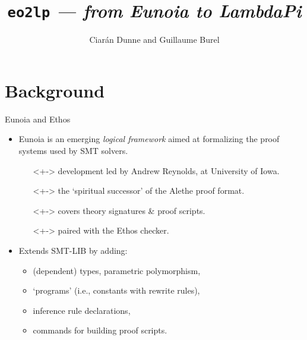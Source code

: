 \documentclass[handout, lualatex, compress, 12pt-------------------------------------------------------------------------------------------------------------]{beamer}
\title{\texttt{eo2lp} \textit{--- from Eunoia to LambdaPi}}
\author{Ciarán Dunne and Guillaume Burel}
\institute{ENS Paris-Saclay, INRIA}
\begin{document}
\frame[plain]{\titlepage}

\section{Background}


%
%


%

\begin{frame}[fragile]{Eunoia and Ethos}
	\begin{itemize}
		\item<+->
		      \alert{Eunoia} is an emerging \emph{logical framework} aimed at
		      formalizing the proof systems used by SMT solvers.
		      \begin{itemize}
			      \item[\emoji{flag-united-states}]<+->
			            development led by Andrew Reynolds, at University of Iowa.
			      \item[\emoji{ghost}]<+-> the `spiritual successor' of the \alert{Alethe} proof format.
			      \item[\emoji{scroll}]<+-> covers theory signatures \& proof scripts.
			      \item[\emoji{check-mark}]<+-> paired with the \alert{Ethos} checker.
		      \end{itemize}

		\item<+-> Extends SMT-LIB by adding:
		      \begin{itemize}
			      \item<+->(dependent) types, parametric polymorphism,
			      \item<+->`programs' (i.e., constants with rewrite rules),
			      \item<+->inference rule declarations,
			      \item<+->commands for building proof scripts.
		      \end{itemize}
	\end{itemize}
\end{frame}
\end{document}
